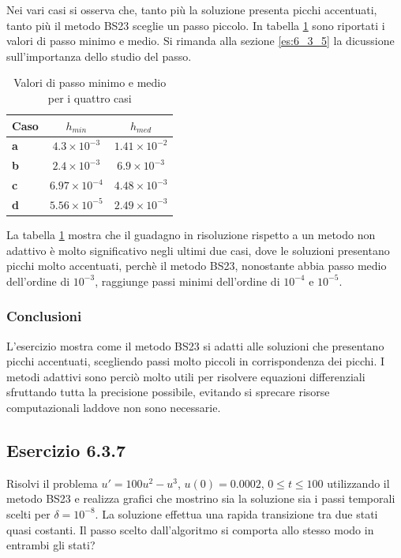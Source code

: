 \documentclass[letterpaper, 12pt]{article}
\numberwithin{equation}{section}    %
\begin{document}
Nei vari casi si osserva che, tanto più la soluzione presenta picchi accentuati, tanto più il metodo BS23
sceglie un passo piccolo. In tabella \ref{tab:passi} sono riportati i valori di passo minimo e medio. 
Si rimanda alla sezione \ref{es:6_3_5} la dicussione sull'importanza dello studio del passo. \\
\begin{table}[!ht]
    \centering
    \caption{Valori di passo minimo e medio per i quattro casi}
    \label{tab:passi}
    \begin{tabular}{|l|c|c|}
        \hline
        \textbf{Caso} & \textbf{$h_{min}$} & \textbf{$h_{med}$} \\
        \hline
        \textbf{a} & $4.3 \times 10^{-3}$ & $1.41 \times 10^{-2}$ \\
        \textbf{b} & $2.4 \times 10^{-3}$ & $6.9 \times 10^{-3}$ \\
        \textbf{c} & $6.97 \times 10^{-4}$ & $4.48 \times 10^{-3}$ \\
        \textbf{d} & $5.56 \times 10^{-5}$ & $2.49 \times 10^{-3}$ \\
        \hline
    \end{tabular}
\end{table}

La tabella \ref{tab:passi} mostra che il guadagno in risoluzione rispetto a un metodo non adattivo è 
molto significativo negli 
ultimi due casi, dove le soluzioni presentano picchi molto accentuati, perchè il metodo BS23, nonostante abbia 
passo medio dell'ordine di $10^{-3}$, raggiunge passi minimi dell'ordine di $10^{-4}$ e $10^{-5}$. 

\subsubsection{Conclusioni}
L'esercizio mostra come il metodo BS23 si adatti alle soluzioni che presentano picchi accentuati,
scegliendo passi molto piccoli in corrispondenza dei picchi. I metodi adattivi sono perciò molto
utili per risolvere equazioni differenziali sfruttando tutta la precisione possibile, evitando si 
sprecare risorse computazionali laddove non sono necessarie.

\subsection{Esercizio 6.3.7}
Risolvi il problema $u'=100u^2-u^3$, $u(0)=0.0002$, $0\le t \le 100$ utilizzando il metodo BS23 e 
realizza grafici che mostrino sia la soluzione sia i passi temporali scelti per $\delta=10^{-8}$. 
La soluzione effettua una rapida transizione tra due stati quasi costanti. Il passo scelto dall'algoritmo 
si comporta allo stesso modo in entrambi gli stati?
\end{document}
